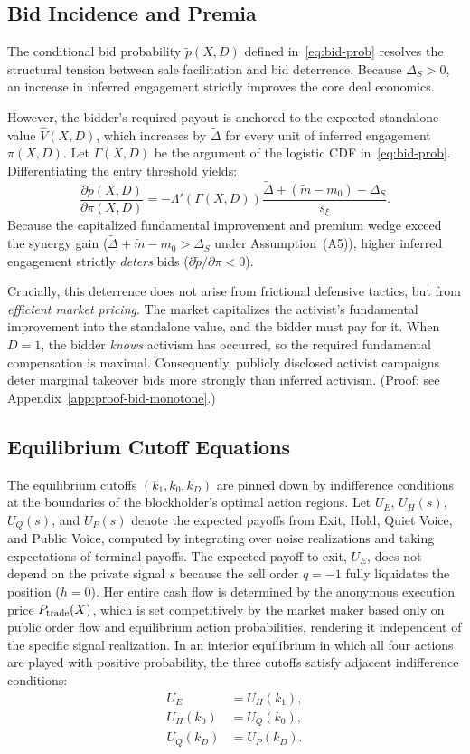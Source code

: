 \documentclass[11pt]{article}
\newcommand{\1}{\mathbf{1}}
\begin{document}
%
\subsection{Bid Incidence and Premia}
%

The conditional bid probability $\tilde{p}(X,D)$ defined in~\eqref{eq:bid-prob} resolves the structural tension between sale facilitation and bid deterrence. Because $\Delta_S > 0$, an increase in inferred engagement strictly improves the core deal economics.

However, the bidder's required payout is anchored to the expected standalone value $\hat{V}(X,D)$, which increases by $\tilde{\Delta}$ for every unit of inferred engagement $\pi(X,D)$. Let $\Gamma(X,D)$ be the argument of the logistic CDF in~\eqref{eq:bid-prob}. Differentiating the entry threshold yields:
\[
\frac{\partial \tilde{p}(X,D)}{\partial \pi(X,D)} = - \Lambda'\left(\Gamma(X,D)\right) \frac{\tilde{\Delta} + (\tilde{m}-m_0) - \Delta_S}{s_\xi}.
\]
Because the capitalized fundamental improvement and premium wedge exceed the synergy gain ($\tilde{\Delta} + \tilde{m}-m_0 > \Delta_S$ under Assumption~\textup{(A5)}), higher inferred engagement strictly \emph{deters} bids ($\partial \tilde{p} / \partial \pi < 0$).

Crucially, this deterrence does not arise from frictional defensive tactics, but from \emph{efficient market pricing}. The market capitalizes the activist's fundamental improvement into the standalone value, and the bidder must pay for it. When $D=1$, the bidder \emph{knows} activism has occurred, so the required fundamental compensation is maximal. Consequently, publicly disclosed activist campaigns deter marginal takeover bids more strongly than inferred activism. (Proof: see Appendix~\ref{app:proof-bid-monotone}.)

%
\subsection{Equilibrium Cutoff Equations}

The equilibrium cutoffs $(k_1,k_0,k_D)$ are pinned down by indifference conditions at the boundaries of the blockholder's optimal action regions. Let $U_E$, $U_H(s)$, $U_Q(s)$, and $U_P(s)$ denote the expected payoffs from Exit, Hold, Quiet Voice, and Public Voice, computed by integrating over noise realizations and taking expectations of terminal payoffs. The expected payoff to exit, $U_E$, does not depend on the private signal $s$ because the sell order $q=-1$ fully liquidates the position ($h=0$). Her entire cash flow is determined by the anonymous execution price $P_{\textup{trade}}(X)$, which is set competitively by the market maker based only on public order flow and equilibrium action probabilities, rendering it independent of the specific signal realization. In an interior equilibrium in which all four actions are played with positive probability, the three cutoffs satisfy adjacent indifference conditions:
\begin{align}
U_E &= U_H(k_1), \label{eq:k1} \\
U_H(k_0) &= U_Q(k_0), \label{eq:k0} \\
U_Q(k_D) &= U_P(k_D). \label{eq:kD}
\end{align}
\end{document}
